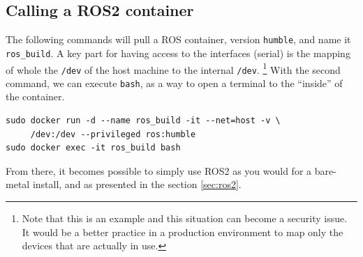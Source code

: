 \documentclass[10pt]{article}
\begin{document}
\subsection{Calling a ROS2 container}
\label{sec:call-ros2-cont}
The following commands will pull a ROS container, version \verb|humble|, and name it \verb|ros_build|.
A key part for having access to the interfaces (serial) is the mapping of whole the \verb|/dev| of  the host machine to the
internal \verb|/dev|. \footnote{Note that this is an example and this situation can become a security issue. It would be a better practice
in a production environment to map only the devices that are actually in use.}
With the second command, we can execute \verb|bash|, as a way to open a terminal to the ``inside'' of the container.
\begin{tcolorbox}
\begin{verbatim}
sudo docker run -d --name ros_build -it --net=host -v \
     /dev:/dev --privileged ros:humble
sudo docker exec -it ros_build bash
\end{verbatim}
\end{tcolorbox}

From there, it becomes possible to simply use ROS2 as you would for a bare-metal install, and as presented in the section \ref{sec:ros2}.
\end{document}

